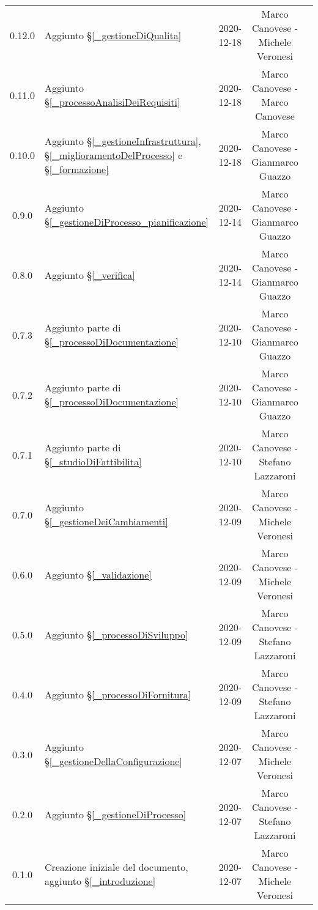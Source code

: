 \begin{center}
\begin{longtable}{|c|p{5cm}|c|c|c|}

		0.12.0 & Aggiunto \S\ref{_gestioneDiQualita} & 2020-12-18 & Marco Canovese - Michele Veronesi \\
		0.11.0 & Aggiunto \S\ref{_processoAnalisiDeiRequisiti} & 2020-12-18 & Marco Canovese - Marco Canovese  \\
		0.10.0 & Aggiunto \S\ref{_gestioneInfrastruttura}, \S\ref{_miglioramentoDelProcesso} e \S\ref{_formazione} & 2020-12-18 & Marco Canovese - Gianmarco Guazzo  \\
		0.9.0 & Aggiunto \S\ref{_gestioneDiProcesso_pianificazione} & 2020-12-14 & Marco Canovese - Gianmarco Guazzo \\
		0.8.0 & Aggiunto \S\ref{_verifica} & 2020-12-14& Marco Canovese - Gianmarco Guazzo \\
		0.7.3 & Aggiunto parte di \S\ref{_processoDiDocumentazione} & 2020-12-10 & Marco Canovese - Gianmarco Guazzo \\
		0.7.2 & Aggiunto parte di \S\ref{_processoDiDocumentazione} & 2020-12-10 & Marco Canovese - Gianmarco Guazzo \\
		0.7.1 & Aggiunto parte di \S\ref{_studioDiFattibilita} & 2020-12-10 & Marco Canovese - Stefano Lazzaroni  \\
		0.7.0 & Aggiunto \S\ref{_gestioneDeiCambiamenti} & 2020-12-09 & Marco Canovese - Michele Veronesi \\
		0.6.0 & Aggiunto \S\ref{_validazione} & 2020-12-09 & Marco Canovese - Michele Veronesi  \\
		0.5.0 & Aggiunto \S\ref{_processoDiSviluppo} & 2020-12-09 & Marco Canovese - Stefano Lazzaroni  \\
		0.4.0 & Aggiunto \S\ref{_processoDiFornitura} & 2020-12-09 & Marco Canovese - Stefano Lazzaroni \\
		0.3.0 & Aggiunto \S\ref{_gestioneDellaConfigurazione} & 2020-12-07 & Marco Canovese - Michele Veronesi  \\
		0.2.0 & Aggiunto \S\ref{_gestioneDiProcesso} & 2020-12-07 & Marco Canovese - Stefano Lazzaroni \\
		0.1.0 & Creazione iniziale del documento, aggiunto \S\ref{_introduzione} & 2020-12-07 & Marco Canovese - Michele Veronesi \\
		
		\hline
	\end{longtable}
\end{center}